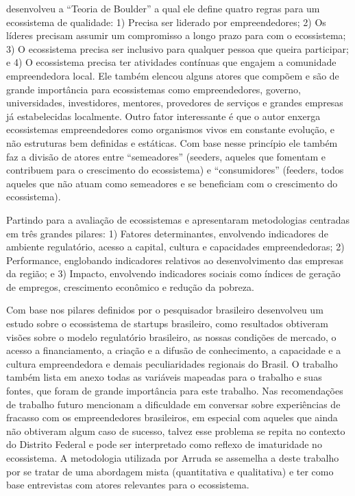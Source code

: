  desenvolveu a ``Teoria de Boulder'' a qual ele define quatro regras para um ecossistema de qualidade: 1) Precisa ser liderado por empreendedores; 2) Os líderes precisam assumir um compromisso a longo prazo para com o ecossistema; 3) O ecossistema precisa ser inclusivo para qualquer pessoa que queira participar; e 4) O ecossistema precisa ter atividades contínuas que engajem a comunidade empreendedora local. Ele também elencou alguns atores que compõem e são de grande importância para ecossistemas como empreendedores, governo, universidades, investidores, mentores, provedores de serviços e grandes empresas já estabelecidas localmente. Outro fator interessante é que o autor enxerga ecossistemas empreendedores como organismos vivos em constante evolução, e não estruturas bem definidas e estáticas. Com base nesse princípio ele também faz a divisão de atores entre ``semeadores'' (seeders, aqueles que fomentam e contribuem para o crescimento do ecossistema) e ``consumidores'' (feeders, todos aqueles que não atuam como semeadores e se beneficiam com o crescimento do ecossistema).  

Partindo para a avaliação de ecossistemas  e  apresentaram metodologias centradas em três grandes pilares: 1) Fatores determinantes, envolvendo indicadores de ambiente regulatório, acesso a capital, cultura e capacidades empreendedoras; 2) Performance, englobando indicadores relativos ao desenvolvimento das empresas da região; e 3) Impacto, envolvendo indicadores sociais como índices de geração de empregos, crescimento econômico e redução da pobreza.

Com base nos pilares definidos por  o pesquisador brasileiro  desenvolveu um estudo sobre o ecossistema de startups brasileiro, como resultados obtiveram visões sobre o modelo regulatório brasileiro, as nossas condições de mercado, o acesso a financiamento, a criação e a difusão de conhecimento, a capacidade e a cultura empreendedora e demais peculiaridades regionais do Brasil. O trabalho também lista em anexo todas as variáveis mapeadas para o trabalho e suas fontes, que foram de grande importância para este trabalho. Nas recomendações de trabalho futuro mencionam a dificuldade em conversar sobre experiências de fracasso com os empreendedores brasileiros, em especial com aqueles que ainda não obtiveram algum caso de sucesso, talvez esse problema se repita no contexto do Distrito Federal e pode ser interpretado como reflexo de imaturidade no ecossistema. A metodologia utilizada por Arruda se assemelha a deste trabalho por se tratar de uma abordagem mista (quantitativa e qualitativa) e ter como base entrevistas com atores relevantes para o ecossistema.

